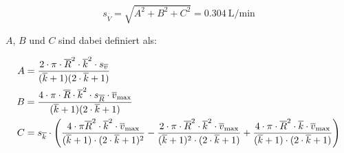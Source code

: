 \begin{equation}
    \label{eq:errorTurbulent:simple}
    s_{\overline{\dot{V}}} = \sqrt{ A^2 + B^2 + C^2 } = \SI{0.304}{\liter\per\minute}
\end{equation}

\noindent $A$, $B$ und $C$ sind dabei definiert als:

\begin{align}
    \label{eq:errorTurbulent:complicated}
    A
    &=
    \frac{%
        2
        \cdot
        \pi
        \cdot
        \overline{R}^2
        \cdot
        \overline{k}^2
        \cdot
        s_{\overline{v}}
    }{%
        (
            \overline{k}
            +
            1
        )
        (
            2
            \cdot
            \overline{k}
            +
            1
        )
    }
    \\
    B
    &=
    \frac{%
        4
        \cdot
        \pi
        \cdot
        \overline{R}
        \cdot
        \overline{k}^2
        \cdot
        s_{\overline{R}}
        \cdot
        \overline{v}_{\mathrm{max}}
    }{%
        (
            \overline{k}
            +
            1
        )
        (
            2
            \cdot
            \overline{k}
            +
            1
        )
    }
    \\
    C
    &=
    s_{\overline{k}}
    \cdot
    \left(
        \frac{%
            4
            \cdot
            \pi
            \overline{R}^2
            \cdot
            \overline{k}^2
            \cdot
            \overline{v}_{\mathrm{max}}
        }{%
            (
                \overline{k}
                +
                1
            )
            \cdot
            (
                2
                \cdot
                \overline{k}
                +
                1
            )^2
        }
        -
        \frac{%
            2
            \cdot
            \pi
            \cdot
            \overline{R}^2
            \cdot
            \overline{k}^2
            \cdot
            \overline{v}_{\mathrm{max}}
        }{%
            (
                \overline{k}
                +
                1
            )^2
            \cdot
            (
                2
                \cdot
                \overline{k}
                +
                1
            )
        }
        +
        \frac{%
            4
            \cdot
            \pi
            \cdot
            \overline{R}^2
            \cdot
            \overline{k}
            \cdot
            \overline{v}_{\mathrm{max}}
        }{%
            (
                \overline{k}
                +
                1
            )
            \cdot
            (
                2
                \cdot
                \overline{k}
                +
                1
            )
        }
    \right)
\end{align}

